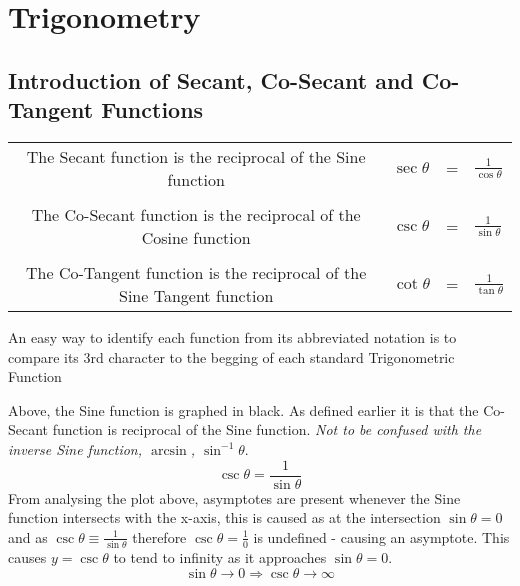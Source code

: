 \documentclass{article}
\begin{document}
	\section{Trigonometry}
	\subsection{Introduction of Secant, Co-Secant and Co-Tangent Functions}
	\begin{center}
		\begin{tabular}{clcl}
			The Secant function is the reciprocal of the Sine function & $\sec\theta$ & = & $\displaystyle{\frac{1}{\cos\theta}}$ \\\\
			The Co-Secant function is the reciprocal of the Cosine function &$\csc\theta$ & = & $\displaystyle{\frac{1}{\sin\theta}}$ \\\\
			The Co-Tangent function is the reciprocal of the Sine Tangent function &$\cot\theta$ & = & $\displaystyle{\frac{1}{\tan\theta}}$ 
		\end{tabular}
	\end{center}
	An easy way to identify each function from its abbreviated notation is to compare its 3rd character to the begging of each standard Trigonometric Function
	\begin{center}
	\end{center}
	Above, the Sine function is graphed in black. As defined earlier it is that the Co-Secant function is reciprocal of the Sine function. \textit{Not to be confused with the inverse Sine function, $\arcsin$, $\sin^{-1}\theta$}. $$\csc\theta = \frac{1}{\sin\theta}$$ From analysing the plot above, asymptotes are present whenever the Sine function intersects with the x-axis, this is caused as at the intersection $\sin\theta=0$ and as $\csc\theta\equiv\frac{1}{\sin\theta}$ therefore $\csc\theta=\frac{1}{0}$ is undefined - causing an asymptote. This causes $y=\csc\theta$ to tend to infinity as it approaches  $\sin\theta=0$. $$\sin\theta \to 0 \Rightarrow \csc\theta\to\infty$$
	\\
	\begin{center}
	\end{center}
\end{document}

